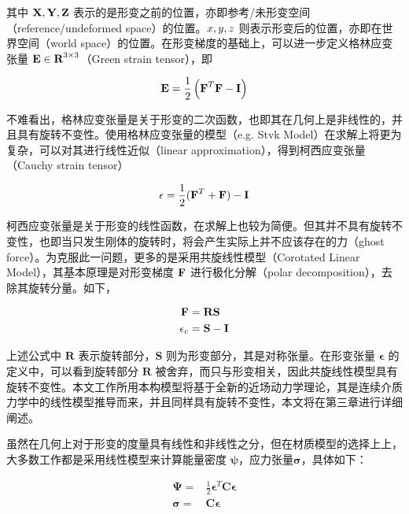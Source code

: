 其中 $\textbf{X}, \textbf{Y}, \textbf{Z}$ 表示的是形变之前的位置，亦即参考/未形变空间（reference/undeformed space）的位置。$\boldmath{x}, \boldmath{y}, \boldmath{z}$ 则表示形变后的位置，亦即在世界空间（world space）的位置。在形变梯度的基础上，可以进一步定义格林应变张量 $\textbf{E} \in \textbf{R}^{3\times3}$（Green strain tensor），即

\begin{equation}
\textbf{E} = \frac{1}{2}\left(\textbf{F}^{T}\textbf{F} - \textbf{I}\right)
\end{equation}

不难看出，格林应变张量是关于形变的二次函数，也即其在几何上是非线性的，并且具有旋转不变性。使用格林应变张量的模型（e.g. Stvk Model）在求解上将更为复杂，可以对其进行线性近似（linear approximation），得到柯西应变张量（Cauchy strain tensor）

\begin{equation}
\mathbf{\epsilon} = \frac{1}{2}(\textbf{F}^T + \textbf{F}) - \textbf{I}
\end{equation}

柯西应变张量是关于形变的线性函数，在求解上也较为简便。但其并不具有旋转不变性，也即当只发生刚体的旋转时，将会产生实际上并不应该存在的力（ghost force）。为克服此一问题，更多的是采用共旋线性模型（Corotated Linear Model），其基本原理是对形变梯度 $\textbf{F}$ 进行极化分解（polar decomposition），去除其旋转分量。如下，

\begin{equation}
\begin{aligned}
\textbf{F} & = \textbf{RS} \\
\mathbf{\epsilon}_c & = \textbf{S} - \textbf{I}
\end{aligned}
\end{equation}

上述公式中 $\textbf{R}$ 表示旋转部分，$\textbf{S}$ 则为形变部分，其是对称张量。在形变张量 $\mathbf{\epsilon}$ 的定义中，可以看到旋转部分 $\textbf{R}$ 被舍弃，而只与形变相关，因此共旋线性模型具有旋转不变性。本文工作所用本构模型将基于全新的近场动力学理论，其是连续介质力学中的线性模型推导而来，并且同样具有旋转不变性，本文将在第三章进行详细阐述。

虽然在几何上对于形变的度量具有线性和非线性之分，但在材质模型的选择上上，大多数工作都是采用线性模型来计算能量密度 $\mathbf{\psi} $，应力张量$\mathbf{\sigma}$，具体如下：

\begin{equation}
\begin{aligned}
\mathbf{\Psi} = &\frac{1}{2}\mathbf{\epsilon}^T\textbf{C}\mathbf{\epsilon}\\
\mathbf{\sigma} = &\textbf{C}\mathbf{\epsilon}
\end{aligned}
\end{equation}

